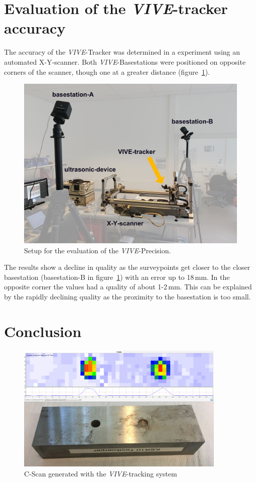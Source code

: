 \documentclass{VRARWorkshop}
\begin{document}
\section{Evaluation of the \textit{VIVE}-tracker accuracy}
The accuracy of the \textit{VIVE}-Tracker was determined in a experiment using an automated X-Y-scanner.
Both \textit{VIVE}-Basestations were positioned on opposite corners of the scanner, though one at a greater distance (figure~\ref{fig:precisionMeasurementSetup}).

\begin{figure}[h!]
    \begin{center}
        \includegraphics[width=120mm]{images/PrecisionMeasurement}
        \caption{\label{fig:precisionMeasurementSetup} Setup for the evaluation of the \textit{VIVE}-Precision.}
    \end{center}
\end{figure}

The results show a decline in quality as the surveypoints get closer to the closer basestation (basestation-B in figure~\ref{fig:precisionMeasurementSetup}) with an error up to 18\,mm.
In the opposite corner the values had a quality of about 1-2\,mm.
This can be explained by the rapidly declining quality as the proximity to the basestation is too small.

\section{Conclusion}

\begin{figure}[h!]
    \begin{center}
        \includegraphics[width=100mm]{images/CScanARUS}
        \caption{\label{fig:resultCScan} C-Scan generated with the \textit{VIVE}-tracking system}
    \end{center}
\end{figure}

\VRARsetbibstyle

\end{document}
